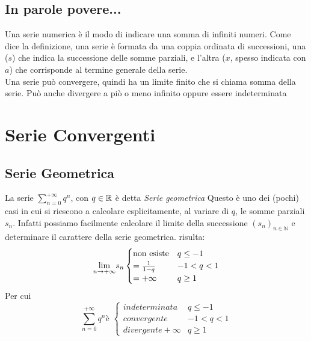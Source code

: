 \documentclass[12pt, a4paper, openany]{book}
\begin{document}
	\subsection*{In parole povere...}
	Una serie numerica è il modo di indicare una somma di infiniti numeri.
	Come dice la definizione, una serie è formata da una coppia ordinata di successioni, una ($s$) che indica la successione delle somme parziali, e l'altra ($x$, spesso indicata con $a$) che corrisponde al termine generale della serie.
	\\Una serie può convergere, quindi ha un limite finito che si chiama somma della serie. Può anche divergere a piò o meno infinito oppure essere indeterminata


	\section{Serie Convergenti}
	\subsection{Serie Geometrica}
	La serie $\sum_{n=0}^{+\infty} q^n$, con $q \in \mathbb{R}$ è detta \emph{Serie geometrica}
	Questo è uno dei (pochi) casi in cui si riescono a calcolare esplicitamente, al variare di $q$, le somme parziali $s_n$.
	Infatti possiamo facilmente calcolare il limite della successione $(s_n)_{n\in \mathbb{N}}$ e determinare il carattere della serie geometrica.
	risulta:
	\begin{equation}
		\underset{n \to +\infty}{\lim} s_n \begin{cases}
			\text{non esiste} & q \leq -1  \\
			= \frac{1}{1-q}   & -1 < q < 1 \\
			= +\infty         & q \geq 1
		\end{cases}
	\end{equation}
	Per cui
	\begin{equation}
		\sum_{n=0}^{+\infty} q^n \text{è } \begin{cases}
			indeterminata      & q \leq -1  \\
			convergente        & -1 < q < 1 \\
			divergente +\infty & q \geq 1
		\end{cases}
	\end{equation}

\end{document}
